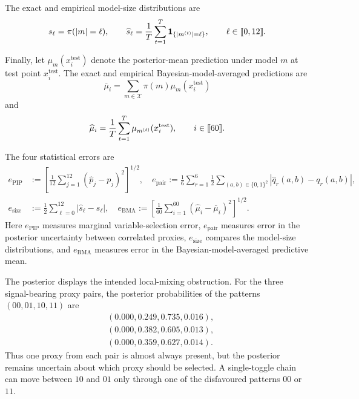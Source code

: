 \documentclass[11pt]{article}
\newcommand{\1}{\mathbf{1}}
\newcommand{\X}{\mathcal{X}}
\providecommand{\llbracket}{\mathopen{[\mkern-2.7mu[}}
\providecommand{\rrbracket}{\mathclose{]\mkern-2.7mu]}}
\begin{document}
The exact and empirical model-size distributions are
\[
    s_\ell=\pi(|m|=\ell),
    \qquad
    \widehat s_\ell
    =
    \frac{1}{T}\sum_{t=1}^T
    \1_{\{|m^{(t)}|=\ell\}},
    \qquad \ell\in\llbracket 0,12\rrbracket.
\]

Finally, let $\mu_m(x_i^{\mathrm{test}})$ denote the posterior-mean
prediction under model $m$ at test point $x_i^{\mathrm{test}}$.  The
exact and empirical Bayesian-model-averaged predictions are
\[
    \overline\mu_i
    =
    \sum_{m\in\X}
    \pi(m)\mu_m(x_i^{\mathrm{test}})
\]
and
\[
    \widehat\mu_i
    =
    \frac{1}{T}\sum_{t=1}^T
    \mu_{m^{(t)}}(x_i^{\mathrm{test}}),
    \qquad i\in\llbracket 60\rrbracket.
\]

The four statistical errors are
\begin{equation}
    \label{eq:bvs-errors}
    \begin{aligned}
        e_{\mathrm{PIP}}
        &:=
        \left[
            \frac{1}{12}
            \sum_{j=1}^{12}
            (\widehat p_j-p_j)^2
        \right]^{1/2}, \quad
        e_{\mathrm{pair}}
        :=
        \frac{1}{6}\sum_{r=1}^6
        \frac{1}{2}
        \sum_{(a,b)\in \{0,1\}^2}
        \left|
            \widehat q_r(a,b)-q_r(a,b)
        \right|,\\
        e_{\mathrm{size}}
        &:=
        \frac{1}{2}
        \sum_{\ell=0}^{12}
        |\widehat s_\ell-s_\ell|, \quad
        e_{\mathrm{BMA}}
        :=
        \left[
            \frac{1}{60}
            \sum_{i=1}^{60}
            (\widehat\mu_i-\overline\mu_i)^2
        \right]^{1/2}.
    \end{aligned}
\end{equation}
Here $e_{\mathrm{PIP}}$ measures marginal variable-selection error,
$e_{\mathrm{pair}}$ measures error in the posterior uncertainty
between correlated proxies, $e_{\mathrm{size}}$ compares the
model-size distributions, and $e_{\mathrm{BMA}}$ measures error in
the Bayesian-model-averaged predictive mean.

The posterior displays the intended local-mixing obstruction.  For
the three signal-bearing proxy pairs, the posterior probabilities of
the patterns $(00,01,10,11)$ are
\[
\begin{aligned}
    &(0.000,0.249,0.735,0.016),\\
    &(0.000,0.382,0.605,0.013),\\
    &(0.000,0.359,0.627,0.014).
\end{aligned}
\]
Thus one proxy from each pair is almost always present, but the
posterior remains uncertain about which proxy should be selected.
A single-toggle chain can move between $10$ and $01$ only through
one of the disfavoured patterns $00$ or $11$.
\end{document}
